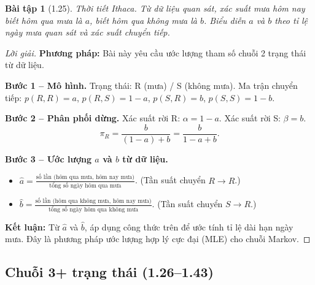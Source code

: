 \documentclass[8pt,a4paper]{article}
\newtheorem{exercise}{Bài tập}
\newenvironment{solution}{\begin{proof}[Lời giải]}{\end{proof}}
\begin{document}
\begin{exercise}[1.25]
Thời tiết Ithaca. Từ dữ liệu quan sát, xác suất mưa hôm nay biết hôm qua mưa là $a$, biết hôm qua không mưa là $b$. Biểu diễn $a$ và $b$ theo tỉ lệ ngày mưa quan sát và xác suất chuyển tiếp.
\end{exercise}
\begin{solution}
\textbf{Phương pháp:} Bài này yêu cầu ước lượng tham số chuỗi 2 trạng thái từ dữ liệu.

\textbf{Bước 1 -- Mô hình.}
Trạng thái: R (mưa) / S (không mưa). Ma trận chuyển tiếp: $p(R,R) = a$, $p(R,S) = 1-a$, $p(S,R) = b$, $p(S,S) = 1-b$.

\textbf{Bước 2 -- Phân phối dừng.}
Xác suất rời R: $\alpha = 1-a$. Xác suất rời S: $\beta = b$.
\[
  \pi_R = \frac{b}{(1-a)+b} = \frac{b}{1-a+b}.
\]

\textbf{Bước 3 -- Ước lượng $a$ và $b$ từ dữ liệu.}
\begin{itemize}
  \item $\hat{a} = \frac{\text{số lần (hôm qua mưa, hôm nay mưa)}}{\text{tổng số ngày hôm qua mưa}}$. (Tần suất chuyển $R\to R$.)
  \item $\hat{b} = \frac{\text{số lần (hôm qua không mưa, hôm nay mưa)}}{\text{tổng số ngày hôm qua không mưa}}$. (Tần suất chuyển $S\to R$.)
\end{itemize}

\textbf{Kết luận:} Từ $\hat{a}$ và $\hat{b}$, áp dụng công thức trên để ước tính tỉ lệ dài hạn ngày mưa. Đây là phương pháp ước lượng hợp lý cực đại (MLE) cho chuỗi Markov.
\end{solution}

\subsection*{Chuỗi 3+ trạng thái (1.26--1.43)}
\end{document}
